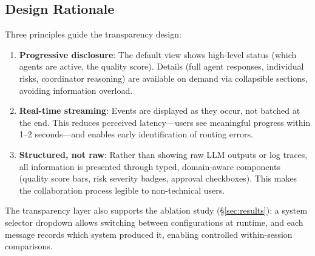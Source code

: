 \subsection{Design Rationale}

Three principles guide the transparency design:

\begin{enumerate}
    \item \textbf{Progressive disclosure}: The default view shows high-level status (which agents are active, the quality score). Details (full agent responses, individual risks, coordinator reasoning) are available on demand via collapsible sections, avoiding information overload.
    \item \textbf{Real-time streaming}: Events are displayed as they occur, not batched at the end. This reduces perceived latency---users see meaningful progress within 1--2 seconds---and enables early identification of routing errors.
    \item \textbf{Structured, not raw}: Rather than showing raw LLM outputs or log traces, all information is presented through typed, domain-aware components (quality score bars, risk severity badges, approval checkboxes). This makes the collaboration process legible to non-technical users.
\end{enumerate}

The transparency layer also supports the ablation study (\S\ref{sec:results}): a system selector dropdown allows switching between configurations at runtime, and each message records which system produced it, enabling controlled within-session comparisons.


